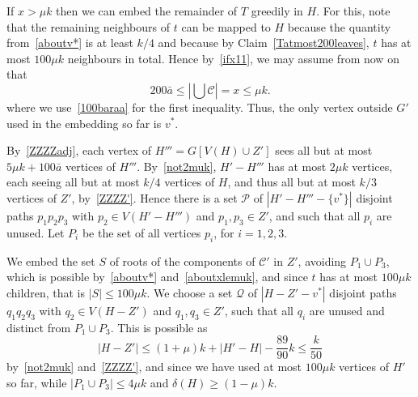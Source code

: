 \documentclass[12pt]{article}
\begin{document}
  If $x> \mu k$ then we can embed the remainder of $T$ greedily in $H$. For this,  note that the remaining neighbours of $t$  can be mapped to $H$ 
because the quantity from~\eqref{aboutv*}  is at least $k/4$ 
          and  because 
          by Claim~\ref{Tatmost200leaves}, 
           $t$ has at most $100\mu k$ neighbours in total. 
         Hence by~\eqref{ifx11}, we may assume from now on that      \begin{equation}\label{aboutxlemuk}200\bar a \le |\bigcup \mathcal C| =  x\le \mu k.     \end{equation}
          where we use~\eqref{100baraa} for the first inequality.
Thus, the only vertex outside $G'$ used in the embedding so far is $v^*$. 


By~\eqref{ZZZZadj}, each vertex of $H'''=G[V(H) \cup Z']$ sees all but at most $5\mu k +100\bar a$  vertices of $H'''$. By~\eqref{not2muk}, $H'-H'''$ has at most $2\mu k$ vertices, each seeing all but at most $k/4$ vertices of $H$, and thus all but at most $k/3$ vertices of $Z'$, by~\eqref{ZZZZ'}.
 Hence  there is  a set $\mathcal P$ of $|H'-H'''-\{v^*\}|$  disjoint paths $p_1p_2p_3$ with $p_2\in V(H'-H''')$ and $p_1, p_3\in Z'$, and such that all $p_i$ are unused.
Let $P_i$ be the set of all vertices $p_i$, for $i=1,2,3$.

We embed the set $S$ of roots of the components of $\mathcal C'$ in  $Z'$, avoiding $P_1\cup P_3$, which is possible by~\eqref{aboutv*} and~\eqref{aboutxlemuk}, and since $t$ has at most $100\mu k$ children, that is $|S|\le 100\mu k$. 
We choose 
a set $\mathcal Q$ of $|H-Z'-v^*|$  disjoint paths $q_1q_2q_3$ with $q_2\in V(H-Z')$ and $q_1, q_3\in Z'$,  such that all $q_i$ are unused and distinct from $P_1\cup P_3$.
This is possible as $$|H-Z'|\le (1+\mu)k+|H'-H|-\frac{89}{90}k\le \frac{k}{50}$$ by~\eqref{not2muk} and~\eqref{ZZZZ'}, and since we have used at most $100\mu k$ vertices of $H'$ so far, while $|P_1\cup P_3|\le 4\mu k$ and $\delta(H)\ge (1-\mu )k$.
\end{document}
